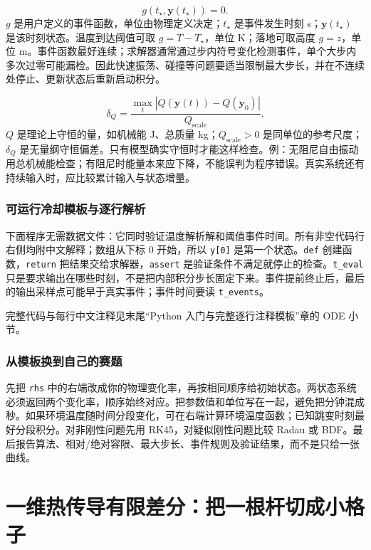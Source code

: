\begin{equation}
g(t_\star,\boldsymbol y(t_\star))=0.
\end{equation}
$g$ 是用户定义的事件函数，单位由物理定义决定；$t_\star$ 是事件发生时刻 s；$\boldsymbol y(t_\star)$ 是该时刻状态。温度到达阈值可取 $g=T-T_\star$，单位 K；落地可取高度 $g=z$，单位 m。事件函数最好连续；求解器通常通过步内符号变化检测事件，单个大步内多次过零可能漏检。因此快速振荡、碰撞等问题要适当限制最大步长，并在不连续处停止、更新状态后重新启动积分。

\begin{equation}
\delta_Q=\frac{\max_t |Q(\boldsymbol y(t))-Q(\boldsymbol y_0)|}{Q_{\mathrm{scale}}}.
\end{equation}
$Q$ 是理论上守恒的量，如机械能 J、总质量 kg；$Q_{\mathrm{scale}}>0$ 是同单位的参考尺度；$\delta_Q$ 是无量纲守恒偏差。只有模型确实守恒时才能这样检查。例：无阻尼自由振动用总机械能检查；有阻尼时能量本来应下降，不能误判为程序错误。真实系统还有持续输入时，应比较累计输入与状态增量。

\subsection{可运行冷却模板与逐行解析}
下面程序无需数据文件：它同时验证温度解析解和阈值事件时间。所有非空代码行右侧均附中文解释；数组从下标 0 开始，所以 \texttt{y[0]} 是第一个状态。\texttt{def} 创建函数，\texttt{return} 把结果交给求解器，\texttt{assert} 是验证条件不满足就停止的检查。\texttt{t\_eval} 只是要求输出在哪些时刻，不是把内部积分步长固定下来。事件提前终止后，最后的输出采样点可能早于真实事件；事件时间要读 \texttt{t\_events}。

完整代码与每行中文注释见末尾“Python 入门与完整逐行注释模板”章的 ODE 小节。

\subsection{从模板换到自己的赛题}
先把 \texttt{rhs} 中的右端改成你的物理变化率，再按相同顺序给初始状态。两状态系统必须返回两个变化率，顺序始终对应。把参数值和单位写在一起，避免把分钟混成秒。如果环境温度随时间分段变化，可在右端计算环境温度函数；已知跳变时刻最好分段积分。对非刚性问题先用 RK45，对疑似刚性问题比较 Radau 或 BDF。最后报告算法、相对/绝对容限、最大步长、事件规则及验证结果，而不是只给一张曲线。

\chapter{一维热传导有限差分：把一根杆切成小格子}

